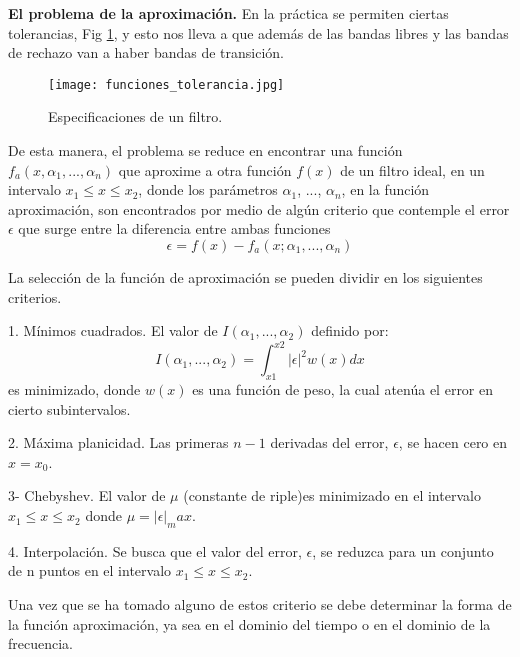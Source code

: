\documentclass[informe.tex]{subfiles}
\begin{document}
\textbf{ El problema de la aproximación.}\newline\newline
En la práctica se permiten ciertas tolerancias, Fig \ref{fig:filtros:funciones:tolerancia}, y esto nos lleva a que además de las bandas libres y las bandas de rechazo van a haber bandas de transición.
 
	\begin{figure}[h!]
	\centering
	\texttt{[image: funciones\_tolerancia.jpg]}	
	\caption{Especificaciones de un filtro.}
	\label{fig:filtros:funciones:tolerancia}
	\end{figure}	 
	
De esta manera, el problema se reduce en encontrar una función $f_a(x, \alpha_1,...,\alpha_n)$ que aproxime a otra función  $f(x)$ de un filtro ideal, en un intervalo $x_1 \leq x \leq x_2$, donde los parámetros $\alpha_1$, $...$, $\alpha_n$, en la función aproximación, son encontrados por medio de algún criterio que contemple el error $\epsilon$ que surge entre la diferencia entre ambas funciones 
	$$
		\epsilon=f(x)-f_a(x; \alpha_1, ..., \alpha_n) 
	$$	

La selección de la función de aproximación se pueden dividir en los siguientes criterios.\newline

1. Mínimos cuadrados. El valor de $I(\alpha_1, ..., \alpha_2)$ definido por:
	$$
		I(\alpha_1, ..., \alpha_2) = \int_{x1}^{x2} |\epsilon|^2 w(x) dx
	$$
es minimizado, donde $w(x)$ es una función de peso, la cual atenúa el error en cierto subintervalos.\newline

2. Máxima planicidad. Las primeras $n-1$ derivadas del error, $\epsilon$, se hacen cero en $x=x_0$.\newline

3- Chebyshev. El valor de $\mu$ (constante de riple)es minimizado en el intervalo $x_1 \leq x \leq x_2$ donde $\mu=|\epsilon|_max$.\newline

4. Interpolación. Se busca que el valor del error, $\epsilon$, se reduzca para un conjunto de n puntos en el intervalo  $x_1 \leq x \leq x_2$.\newline
	
Una vez que se ha tomado alguno de estos criterio se debe determinar la forma de la función aproximación, ya sea en el dominio del tiempo o en el dominio de la frecuencia.\newline\newline
\end{document}
